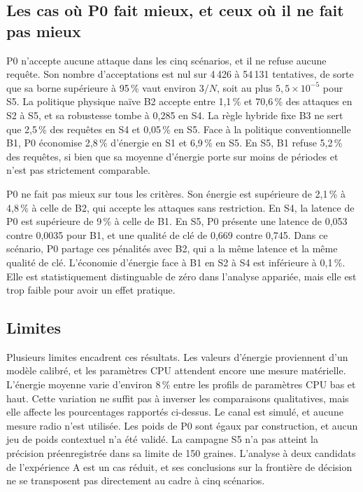 \documentclass[conference]{IEEEtran}
\begin{document}
\subsection{Les cas où P0 fait mieux, et ceux où il ne fait pas mieux}

P0 n'accepte aucune attaque dans les cinq scénarios, et il ne refuse aucune requête. Son nombre d'acceptations est nul sur 4\,426 à 54\,131 tentatives, de sorte que sa borne supérieure à 95\,\% vaut environ $3/N$, soit au plus $5{,}5\times10^{-5}$ pour S5. La politique physique naïve B2 accepte entre 1,1\,\% et 70,6\,\% des attaques en S2 à S5, et sa robustesse tombe à 0,285 en S4. La règle hybride fixe B3 ne sert que 2,5\,\% des requêtes en S4 et 0,05\,\% en S5. Face à la politique conventionnelle B1, P0 économise 2,8\,\% d'énergie en S1 et 6,9\,\% en S5. En S5, B1 refuse 5,2\,\% des requêtes, si bien que sa moyenne d'énergie porte sur moins de périodes et n'est pas strictement comparable.

P0 ne fait pas mieux sur tous les critères. Son énergie est supérieure de 2,1\,\% à 4,8\,\% à celle de B2, qui accepte les attaques sans restriction. En S4, la latence de P0 est supérieure de 9\,\% à celle de B1. En S5, P0 présente une latence de 0,053 contre 0,0035 pour B1, et une qualité de clé de 0,669 contre 0,745. Dans ce scénario, P0 partage ces pénalités avec B2, qui a la même latence et la même qualité de clé. L'économie d'énergie face à B1 en S2 à S4 est inférieure à 0,1\,\%. Elle est statistiquement distinguable de zéro dans l'analyse appariée, mais elle est trop faible pour avoir un effet pratique.

\subsection{Limites}

Plusieurs limites encadrent ces résultats. Les valeurs d'énergie proviennent d'un modèle calibré, et les paramètres CPU attendent encore une mesure matérielle. L'énergie moyenne varie d'environ 8\,\% entre les profils de paramètres CPU bas et haut. Cette variation ne suffit pas à inverser les comparaisons qualitatives, mais elle affecte les pourcentages rapportés ci-dessus. Le canal est simulé, et aucune mesure radio n'est utilisée. Les poids de P0 sont égaux par construction, et aucun jeu de poids contextuel n'a été validé. La campagne S5 n'a pas atteint la précision préenregistrée dans sa limite de 150 graines. L'analyse à deux candidats de l'expérience A est un cas réduit, et ses conclusions sur la frontière de décision ne se transposent pas directement au cadre à cinq scénarios.
\end{document}
